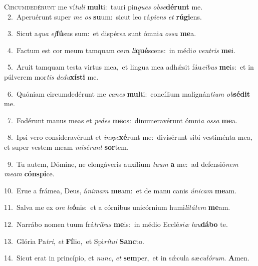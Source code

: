 \lettrine{\initial\textcolor{\initialcolor}{C}}{ircumdedérunt} me ví\-\textit{tu}\-\textit{li} \textbf{mul}\-ti:~\star tauri pin\textit{gues} \textit{ob}\-\textit{se}\textbf{dé}\textbf{runt} me.\\
{\numbfont\textcolor{\numbcolor}{~2.}}~Aperuérunt super \textit{me} \textit{os} \textbf{su}\-um:~\star sicut leo rá\-\textit{pi}\-\textit{ens} \textit{et} \textbf{rú}\-\textbf{gi}ens.\par
{\numbfont\textcolor{\numbcolor}{~3.}}~Sicut a\textit{qua} \textit{ef}\-\textbf{fú}sus sum:~\star et dispérsa sunt ómni\textit{a} \textit{os}\-\textit{sa} \textbf{me}\-a.\par
{\numbfont\textcolor{\numbcolor}{~4.}}~Factum est cor meum tamquam ce\textit{ra} \textit{li}\-\textbf{qué}scens:~\star in médi\textit{o} \textit{ven}\-\textit{tris} \textbf{me}\-i.\par
{\numbfont\textcolor{\numbcolor}{~5.}}~Aruit tamquam testa virtus mea,~\dagger et lingua mea adhǽsit fáu\-\textit{ci}\-\textit{bus} \textbf{me}\-is:~\star et in púlverem mor\textit{tis} \textit{de}\-\textit{du}\textbf{xís}\textbf{ti} me.\par
{\numbfont\textcolor{\numbcolor}{~6.}}~Quóniam circumdedérunt me \textit{ca}\-\textit{nes} \textbf{mul}\-ti:~\star concílium malignán\-\textit{ti}\-\textit{um} \textit{ob}\-\textbf{sé}\textbf{dit} me.\par
{\numbfont\textcolor{\numbcolor}{~7.}}~Fodérunt manus meas et \textit{pe}\-\textit{des} \textbf{me}\-os:~\star dinumeravérunt ómni\textit{a} \textit{os}\-\textit{sa} \textbf{me}\-a.\par
{\numbfont\textcolor{\numbcolor}{~8.}}~Ipsi vero consideravérunt et \textit{in}\-\textit{spe}\textbf{xé}runt me:~\star divisérunt sibi vestiménta mea, et super vestem meam \textit{mi}\-\textit{sé}\textit{runt} \textbf{sor}\-tem.\par
{\numbfont\textcolor{\numbcolor}{~9.}}~Tu autem, Dómine, ne elongáveris auxílium \textit{tu}\-\textit{um} \textbf{a} me:~\star ad defensió\textit{nem} \textit{me}\-\textit{am} \textbf{cón}\-\textbf{spi}ce.\par
{\numbfont\textcolor{\numbcolor}{10.}}~Erue a frámea, Deus, á\-\textit{ni}\-\textit{mam} \textbf{me}\-am:~\star et de manu canis \textit{ú}\-\textit{ni}\textit{cam} \textbf{me}\-am.\par
{\numbfont\textcolor{\numbcolor}{11.}}~Salva me ex o\textit{re} \textit{le}\-\textbf{ó}nis:~\star et a córnibus unicórnium humi\-\textit{li}\-\textit{tá}\textit{tem} \textbf{me}\-am.\par
{\numbfont\textcolor{\numbcolor}{12.}}~Narrábo nomen tuum frá\-\textit{tri}\-\textit{bus} \textbf{me}\-is:~\star in médio Ecclé\-\textit{si}\-\textit{æ} \textit{lau}\-\textbf{dá}\textbf{bo} te.\par
{\numbfont\textcolor{\numbcolor}{13.}}~Glória Pa\-\textit{tri}\-, \textit{et} \textbf{Fí}\-lio,~\star et Spi\-\textit{rí}\-\textit{tu}\textit{i} \textbf{Sanc}\-to.\par
{\numbfont\textcolor{\numbcolor}{14.}}~Sicut erat in princípio, et \textit{nunc}\-, \textit{et} \textbf{sem}\-per,~\star et in sǽcula sæ\-\textit{cu}\-\textit{ló}\textit{rum}. \textbf{A}\-men.\par
